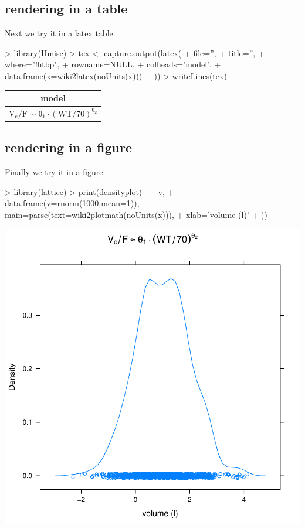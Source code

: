 \documentclass[titlepage]{article}
\begin{document}
\subsection{rendering in a table}
Next we try it in a latex table.
\begin{Schunk}
\begin{Sinput}
> library(Hmisc)
> tex <- capture.output(latex(
+   file='',
+   title='',
+   where="!htbp",
+   rowname=NULL,
+   colheads='model',
+   data.frame(x=wiki2latex(noUnits(x)))
+ ))
> writeLines(tex)
\end{Sinput}
%
\begin{table}[!htbp]
 \begin{center}
 \begin{tabular}{l}\hline\hline
\multicolumn{1}{c}{model}\tabularnewline
\hline
$\mathrm{V_{c}/F  \sim\theta_{1}\cdot(WT/70)^{\theta_{2}}}$\tabularnewline
\hline
\end{tabular}

\end{center}

\end{table}\end{Schunk}
\subsection{rendering in a figure}
Finally we try it in a figure.
\begin{Schunk}
\begin{Sinput}
> library(lattice)
> print(densityplot(
+   ~v,
+   data.frame(v=rnorm(1000,mean=1)),
+   main=parse(text=wiki2plotmath(noUnits(x))),
+   xlab='volume (l)'
+ ))
\end{Sinput}
\end{Schunk}
\includegraphics{wikimath-figure}
\end{document}
